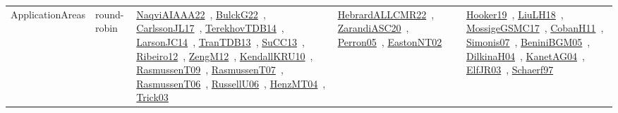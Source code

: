 {\begin{longtable}{lp{3cm}>{\raggedright\arraybackslash}p{6cm}>{\raggedright\arraybackslash}p{6cm}>{\raggedright\arraybackslash}p{8cm}}
\index{round-robin}\index{ApplicationAreas!round-robin}ApplicationAreas & round-robin & \href{../works/NaqviAIAAA22.pdf}{NaqviAIAAA22}~\cite{NaqviAIAAA22}, \href{../works/BulckG22.pdf}{BulckG22}~\cite{BulckG22}, \href{../works/CarlssonJL17.pdf}{CarlssonJL17}~\cite{CarlssonJL17}, \href{../works/TerekhovTDB14.pdf}{TerekhovTDB14}~\cite{TerekhovTDB14}, \href{../works/LarsonJC14.pdf}{LarsonJC14}~\cite{LarsonJC14}, \href{../works/TranTDB13.pdf}{TranTDB13}~\cite{TranTDB13}, \href{../works/SuCC13.pdf}{SuCC13}~\cite{SuCC13}, \href{../works/Ribeiro12.pdf}{Ribeiro12}~\cite{Ribeiro12}, \href{../works/ZengM12.pdf}{ZengM12}~\cite{ZengM12}, \href{../works/KendallKRU10.pdf}{KendallKRU10}~\cite{KendallKRU10}, \href{../works/RasmussenT09.pdf}{RasmussenT09}~\cite{RasmussenT09}, \href{../works/RasmussenT07.pdf}{RasmussenT07}~\cite{RasmussenT07}, \href{../works/RasmussenT06.pdf}{RasmussenT06}~\cite{RasmussenT06}, \href{../works/RussellU06.pdf}{RussellU06}~\cite{RussellU06}, \href{../works/HenzMT04.pdf}{HenzMT04}~\cite{HenzMT04}, \href{../works/Trick03.pdf}{Trick03}~\cite{Trick03} & \href{../works/HebrardALLCMR22.pdf}{HebrardALLCMR22}~\cite{HebrardALLCMR22}, \href{../works/ZarandiASC20.pdf}{ZarandiASC20}~\cite{ZarandiASC20}, \href{../works/Perron05.pdf}{Perron05}~\cite{Perron05}, \href{../works/EastonNT02.pdf}{EastonNT02}~\cite{EastonNT02} & \href{../works/Hooker19.pdf}{Hooker19}~\cite{Hooker19}, \href{../works/LiuLH18.pdf}{LiuLH18}~\cite{LiuLH18}, \href{../works/MossigeGSMC17.pdf}{MossigeGSMC17}~\cite{MossigeGSMC17}, \href{../works/CobanH11.pdf}{CobanH11}~\cite{CobanH11}, \href{../works/Simonis07.pdf}{Simonis07}~\cite{Simonis07}, \href{../works/BeniniBGM05.pdf}{BeniniBGM05}~\cite{BeniniBGM05}, \href{../works/DilkinaH04.pdf}{DilkinaH04}~\cite{DilkinaH04}, \href{../works/KanetAG04.pdf}{KanetAG04}~\cite{KanetAG04}, \href{../works/ElfJR03.pdf}{ElfJR03}~\cite{ElfJR03}, \href{../works/Schaerf97.pdf}{Schaerf97}~\cite{Schaerf97}\\

\end{longtable}}
